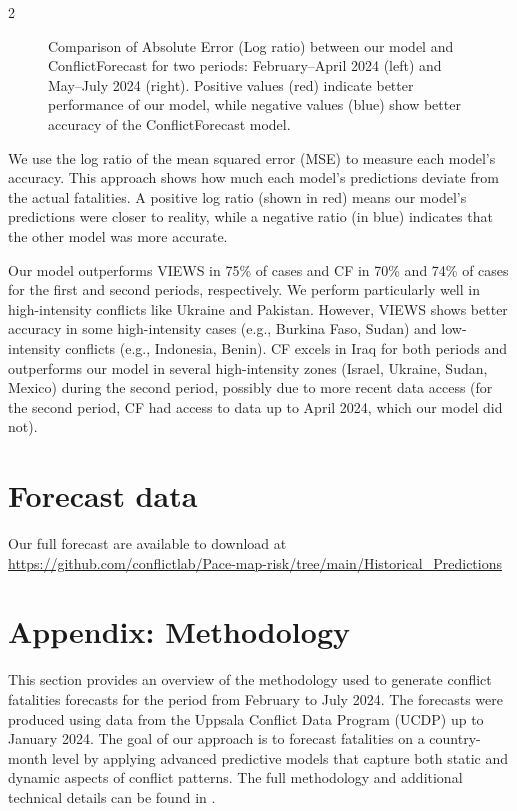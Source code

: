 \documentclass[twocolumn]{erdc}
\begin{document}
\begin{multicols*}{2}
\begin{figure}[!b]
    \caption{Comparison of Absolute Error (Log ratio) between our model and ConflictForecast for two periods: February--April 2024 (left) and May--July 2024 (right). Positive values (red) indicate better performance of our model, while negative values (blue) show better accuracy of the ConflictForecast model.}
    \label{fig:CF_comparison}
\end{figure}
%
%
\par We use the log ratio of the mean squared error (MSE) to measure each model's accuracy. This approach shows how much each model's predictions deviate from the actual fatalities. A positive log ratio (shown in red) means our model's predictions were closer to reality, while a negative ratio (in blue) indicates that the other model was more accurate.  
\par Our model outperforms VIEWS in 75\% of cases and CF in 70\% and 74\% of cases for the first and second periods, respectively. We perform particularly well in high-intensity conflicts like Ukraine and Pakistan. However, VIEWS shows better accuracy in some high-intensity cases (e.g., Burkina Faso, Sudan) and low-intensity conflicts (e.g., Indonesia, Benin). CF excels in Iraq for both periods and outperforms our model in several high-intensity zones (Israel, Ukraine, Sudan, Mexico) during the second period, possibly due to more recent data access (for the second period, CF had access to data up to April 2024, which our model did not).
\end{multicols*}

\clearpage
\newpage
\section*{Forecast data}
Our full forecast are available to download at \url{https://github.com/conflictlab/Pace-map-risk/tree/main/Historical_Predictions}

\section*{Appendix: Methodology}

This section provides an overview of the methodology used to generate conflict fatalities forecasts for the period from February to July 2024. The forecasts were produced using data from the Uppsala Conflict Data Program (UCDP) up to January 2024. The goal of our approach is to forecast fatalities on a country-month level by applying advanced predictive models that capture both static and dynamic aspects of conflict patterns. The full methodology and additional technical details can be found in \cite{chadefaux2022shape,chadefaux2023automated,schincariol2024temporal,Schincariol2024,Schincariol_JoF}. %
\end{document}
